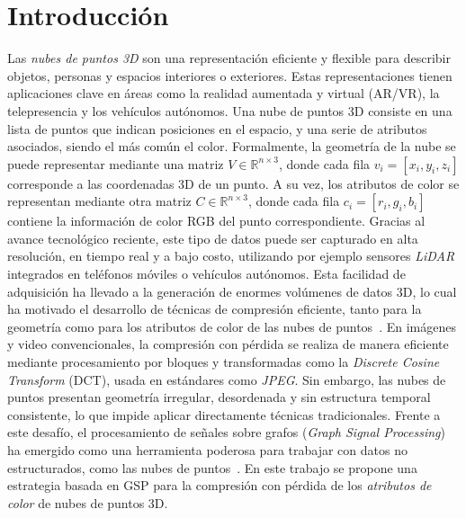 %
%

\chapter{Introducción}
Las \textit{nubes de puntos 3D} son una representación eficiente y flexible para describir objetos, personas y espacios interiores o exteriores. Estas representaciones tienen aplicaciones clave en áreas como la realidad aumentada y virtual (AR/VR), la telepresencia y los vehículos autónomos. Una nube de puntos 3D consiste en una lista de puntos que indican posiciones en el espacio, y una serie de atributos asociados, siendo el más común el color.
\vspace{3mm}
Formalmente, la geometría de la nube se puede representar mediante una matriz $V \in \mathbb{R}^{n \times 3}$, donde cada fila $v_i = [x_i, y_i, z_i]$ corresponde a las coordenadas 3D de un punto. A su vez, los atributos de color se representan mediante otra matriz $C \in \mathbb{R}^{n \times 3}$, donde cada fila $c_i = [r_i, g_i, b_i]$ contiene la información de color RGB del punto correspondiente.
\vspace{3mm}
Gracias al avance tecnológico reciente, este tipo de datos puede ser capturado en alta resolución, en tiempo real y a bajo costo, utilizando por ejemplo sensores \textit{LiDAR} integrados en teléfonos móviles o vehículos autónomos. 
\vspace{3mm}
Esta facilidad de adquisición ha llevado a la generación de enormes volúmenes de datos 3D, lo cual ha motivado el desarrollo de técnicas de compresión eficiente, tanto para la geometría como para los atributos de color de las nubes de puntos~\cite{schwarz2018emerging}.
\vspace{3mm}
En imágenes y video convencionales, la compresión con pérdida se realiza de manera eficiente mediante procesamiento por bloques y transformadas como la \textit{Discrete Cosine Transform} (DCT), usada en estándares como \textit{JPEG}. Sin embargo, las nubes de puntos presentan geometría irregular, desordenada y sin estructura temporal consistente, lo que impide aplicar directamente técnicas tradicionales.
\vspace{3mm}
Frente a este desafío, el procesamiento de señales sobre grafos (\textit{Graph Signal Processing}) ha emergido como una herramienta poderosa para trabajar con datos no estructurados, como las nubes de puntos~\cite{shuman2013emerging, ortega2018graph}. En este trabajo se propone una estrategia basada en GSP para la compresión con pérdida de los \textit{atributos de color} de nubes de puntos 3D.


